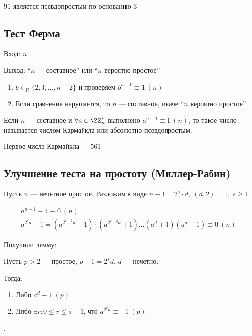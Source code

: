 \begin{example}{}{}
    \( 91 \) является псевдопростым по основанию \( 3 \)
\end{example}

\subsection{Тест Ферма}

Вход: \( n \)

Выход: ``\( n \) --- составное'' или ``\( n \) вероятно простое''

\begin{enumerate}
    \item
        \( b \in_R \{ 2, 3, \ldots, n - 2 \} \) и проверяем \( b^{n - 1} \equiv 1 \: (n) \)
    \item
        Если сравнение нарушается, то \( n \) --- составное,
        иначе ``\( n \) вероятно простое''
\end{enumerate}

\begin{defn}{}{}
    Если \( n \) --- составное и \( \forall a \in \ZZ_n^* \) выполнено \( a^{n - 1} \equiv 1 \: (n) \),
    то такое число называется числом Кармайкла или абсолютно псевдопростым.
\end{defn}

\begin{example}{}{}
    Первое число Кармайкла --- \( 561 \)
\end{example}

\newpage

\subsection{Улучшение теста на простоту (Миллер-Рабин)}

Пусть \( n \) --- нечетное простое.
Разложим в виде \( n - 1 = 2^s \cdot d, \ (d, 2) = 1, \: s \geq 1 \)

\begin{gather*}
    a^{n - 1} - 1 \equiv 0 \: (n)
    \\
    a^{2^s d} - 1 = (a^{2^{s - 1} d} + 1) \cdot (a^{2^{s - 2} d} + 1) \ldots (a^d + 1) (a^d - 1) \equiv 0 \: (n)
\end{gather*}

Получили лемму:
\begin{lemma}{}{}
    Пусть \( p > 2 \) --- простое, \( p - 1 = 2^s d \), \( d \) --- нечетно.

    Тогда:
    \begin{enumerate}
        \item
            Либо \( a^d \equiv 1 \: (p) \)
        \item
            Либо \( \exists r : 0 \leq r \leq s - 1 \), что \( a^{2^r d} \equiv -1 \: (p) \).
    \end{enumerate} ,
\end{lemma}

